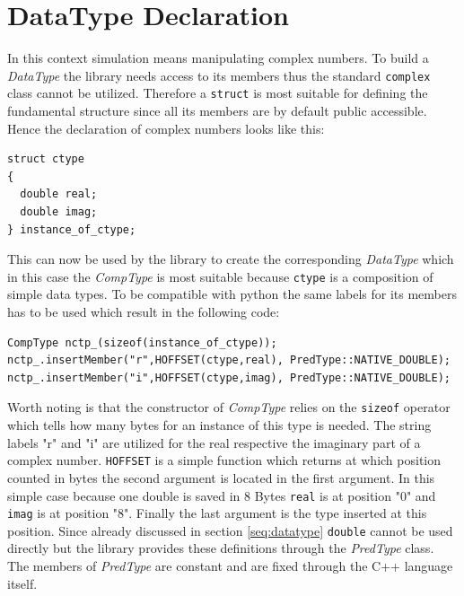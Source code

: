 \section{DataType Declaration}
\label{seq:datatypedec}
In this context simulation means manipulating complex numbers. To build a \textit{DataType} the library needs access to its members thus the standard \texttt{complex} class cannot be utilized. Therefore a \texttt{struct} is most suitable for defining the fundamental structure since all its members are by default public accessible. Hence the declaration of complex numbers looks like this:
\begin{lstlisting}
struct ctype
{
  double real;
  double imag;
} instance_of_ctype;
\end{lstlisting}
This can now be used by the library to create the corresponding \textit{DataType} which in this case the \textit{CompType} is most suitable because \texttt{ctype} is a composition of simple data types. To be compatible with python the same labels for its members has to be used which result in the following code:
\begin{lstlisting}
CompType nctp_(sizeof(instance_of_ctype));
nctp_.insertMember("r",HOFFSET(ctype,real), PredType::NATIVE_DOUBLE);
nctp_.insertMember("i",HOFFSET(ctype,imag), PredType::NATIVE_DOUBLE);
\end{lstlisting}
Worth noting is that the constructor of \textit{CompType} relies on the \texttt{sizeof} operator which tells how many bytes for an instance of this type is needed. The string labels "r" and "i" are utilized for the real respective the imaginary part of a complex number. \texttt{HOFFSET} is a simple function which returns at which position counted in bytes the second argument is located in the first argument. In this simple case because one double is saved in $8$ Bytes \texttt{real} is at position "0" and \texttt{imag} is at position "8". Finally the last argument is the type inserted at this position. Since already discussed in section \ref{seq:datatype} \texttt{double} cannot be used directly but the library provides these definitions through the \textit{PredType} class. The members of \textit{PredType} are constant and are fixed through the C++ language itself.\\

